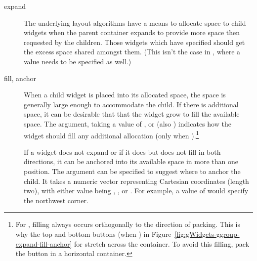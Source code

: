 \begin{description}
\item[expand] The underlying layout algorithms have a means to
  allocate space to child widgets when the parent container expands to
  provide more space then requested by the children. Those widgets
  which have  specified should get the excess space
  shared amongst them. (This isn't the case in ,
  where a  value needs to be specified as well.)
 

\item[fill, anchor] When a child widget is placed into its allocated
  space, the space is generally large enough to accommodate the
  child. If there is additional space, it can be desirable that that
  the widget grow to fill the available space.  The 
  argument, taking a value of ,  or  (also
  ) indicates how the widget should fill any additional
  allocation (only when ).\footnote{For \GTK,
    filling always occurs orthogonally to the direction of
    packing. This is why the top and bottom buttons (when
    ) in
    Figure~\ref{fig:gWidgets-ggroup-expand-fill-anchor} for
     stretch across the container. To avoid this
    filling, pack the button in a horizontal  container.}
 
  If a widget does not expand or if it does but does not fill in both
  directions, it can be anchored into its available space in more than
  one position. The  argument can be specified to suggest
  where to anchor the child. It takes a numeric vector representing
  Cartesian coordinates (length two),
  with either value being , , or . For
  example, a value of  would specify the northwest corner.
\end{description}

